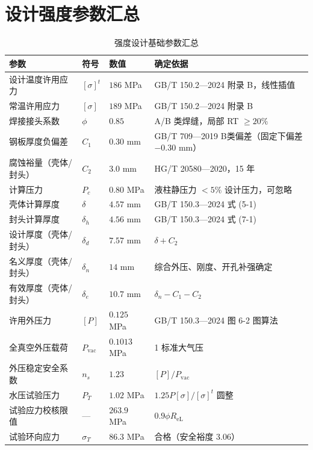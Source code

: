 \section{设计强度参数汇总}
\label{sec:cad-strength-params}

\begin{table}[htbp]
  \centering
  \caption{强度设计基础参数汇总}
  \label{tab:cad-strength-basis}
  \small\renewcommand{\arraystretch}{1.15}
  \setlength{\tabcolsep}{8pt}
  \begin{tabularx}{\textwidth}{@{}l l l l @{}}
    \toprule
    \textbf{参数} & \textbf{符号} & \textbf{数值} & \textbf{确定依据} \\
    \midrule
    设计温度许用应力                    & $[\sigma]^t$   & $186$ MPa      & GB/T 150.2—2024 附录 B，线性插值 \\
    常温许用应力                        & $[\sigma]$     & $189$ MPa      & GB/T 150.2—2024 附录 B \\
    焊接接头系数                        & $\phi$         & $0.85$         & A/B 类焊缝，局部 RT $\ge 20\%$ \\
    钢板厚度负偏差                      & $C_1$          & $0.30$ mm      & GB/T 709—2019 B类偏差（固定下偏差$-0.30$ mm） \\
    腐蚀裕量（壳体/封头）               & $C_2$          & $3.0$ mm       & HG/T 20580—2020，15 年 \\
    计算压力                            & $P_c$          & $0.80$ MPa     & 液柱静压力 $< 5\%$ 设计压力，可忽略 \\
    壳体计算厚度                        & $\delta$       & $4.57$ mm      & GB/T 150.3—2024 式 (5-1) \\
    封头计算厚度                        & $\delta_h$     & $4.56$ mm      & GB/T 150.3—2024 式 (7-1) \\
    设计厚度（壳体/封头）               & $\delta_d$     & $7.57$ mm      & $\delta + C_2$ \\
    名义厚度（壳体/封头）               & $\delta_n$     & $14$ mm        & 综合外压、刚度、开孔补强确定 \\
    有效厚度（壳体/封头）               & $\delta_e$     & $10.7$ mm      & $\delta_n - C_1 - C_2$ \\
    许用外压力                          & $[P]$          & $0.125$ MPa    & GB/T 150.3—2024 图 6-2 图算法 \\
    全真空外压载荷                      & $P_{\text{vac}}$ & $0.1013$ MPa & 1 标准大气压 \\
    外压稳定安全系数                    & $n_s$          & $1.23$         & $[P]/P_{\text{vac}}$ \\
    水压试验压力                        & $P_T$          & $1.02$ MPa     & $1.25P[\sigma]/[\sigma]^t$ 圆整 \\
    试验应力校核限值                    & —              & $263.9$ MPa    & $0.9\phi R_{\text{eL}}$ \\
    试验环向应力                        & $\sigma_T$     & $86.3$ MPa     & 合格（安全裕度 $3.06$） \\
    \bottomrule
  \end{tabularx}
\end{table}

